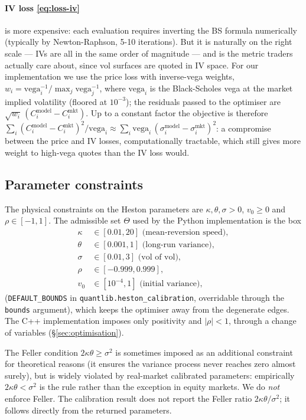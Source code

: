 \documentclass[11pt]{article}
\theoremstyle{plain}
\theoremstyle{definition}
\theoremstyle{remark}
\begin{document}
\paragraph{IV loss \eqref{eq:loss-iv}} is more expensive: each evaluation requires inverting the BS formula numerically (typically by Newton-Raphson, 5-10 iterations). But it is naturally on the right scale --- IVs are all in the same order of magnitude --- and is the metric traders actually care about, since vol surfaces are quoted in IV space. For our implementation we use the price loss with inverse-vega weights, $w_i = \mathrm{vega}_i^{-1} / \max_j \mathrm{vega}_j^{-1}$, where $\mathrm{vega}_i$ is the Black-Scholes vega at the market implied volatility (floored at $10^{-3}$); the residuals passed to the optimiser are $\sqrt{w_i}\,(C_i^{\mathrm{model}} - C_i^{\mathrm{mkt}})$. Up to a constant factor the objective is therefore $\sum_i (C_i^{\mathrm{model}} - C_i^{\mathrm{mkt}})^2 / \mathrm{vega}_i \approx \sum_i \mathrm{vega}_i\, (\sigma_i^{\mathrm{model}} - \sigma_i^{\mathrm{mkt}})^2$: a compromise between the price and IV losses, computationally tractable, which still gives more weight to high-vega quotes than the IV loss would.

\subsection{Parameter constraints}
\label{sec:constraints}

The physical constraints on the Heston parameters are $\kappa, \theta, \sigma > 0$, $v_0 \geq 0$ and $\rho \in [-1, 1]$. The admissible set $\Theta$ used by the Python implementation is the box
\begin{align*}
    \kappa &\in [0.01, 20] \text{ (mean-reversion speed)}, \\
    \theta &\in [0.001, 1] \text{ (long-run variance)}, \\
    \sigma &\in [0.01, 3] \text{ (vol of vol)}, \\
    \rho   &\in [-0.999, 0.999], \\
    v_0    &\in [10^{-4}, 1] \text{ (initial variance)},
\end{align*}
(\texttt{DEFAULT\_BOUNDS} in \texttt{quantlib.heston\_calibration}, overridable through the \texttt{bounds} argument), which keeps the optimiser away from the degenerate edges. The C++ implementation imposes only positivity and $|\rho| < 1$, through a change of variables (\S\ref{sec:optimisation}).

The Feller condition $2\kappa\theta \geq \sigma^2$ is sometimes imposed as an additional constraint for theoretical reasons (it ensures the variance process never reaches zero almost surely), but is widely violated by real-market calibrated parameters: empirically $2\kappa\theta < \sigma^2$ is the rule rather than the exception in equity markets. We do \emph{not} enforce Feller. The calibration result does not report the Feller ratio $2\kappa\theta/\sigma^2$; it follows directly from the returned parameters.
\end{document}
